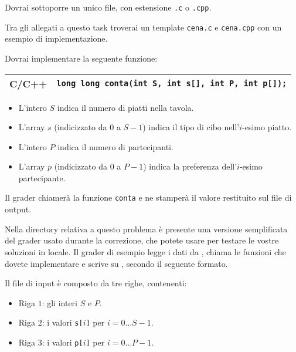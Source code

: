 
\Implementation

Dovrai sottoporre un unico file, con estensione \texttt{.c} o \texttt{.cpp}.

\begin{warning}
Tra gli allegati a questo task troverai un template \texttt{cena.c} e \texttt{cena.cpp}
con un esempio di implementazione.
\end{warning}

Dovrai implementare la seguente funzione:

\begin{center}\begin{tabularx}{\textwidth}{|c|X|}
\hline
C/C++  & \verb|long long conta(int S, int s[], int P, int p[]);|\\
\hline
\end{tabularx}\end{center}

\begin{itemize}[nolistsep]
  \item L'intero $S$ indica il numero di piatti nella tavola.
  \item L'array $s$ (indicizzato da $0$ a $S-1$) indica il tipo di cibo nell'$i$-esimo piatto.
  \item L'intero $P$ indica il numero di partecipanti.
  \item L'array $p$ (indicizzato da $0$ a $P-1$) indica la preferenza dell'$i$-esimo partecipante.
\end{itemize}

Il grader chiamerà la funzione \texttt{conta} e ne stamperà il valore restituito
sul file di output.



\Grader
Nella directory relativa a questo problema è presente una versione semplificata
del grader usato durante la correzione, che potete usare per testare le vostre
soluzioni in locale. Il grader di esempio legge i dati da , chiama
le funzioni che dovete implementare e scrive su \outputfile{}, secondo il
seguente formato.

Il file di input è composto da tre righe, contenenti:
\begin{itemize}[nolistsep,itemsep=2mm]
\item Riga $1$: gli interi $S$ e $P$.
\item Riga $2$: i valori \texttt{s[$i$]} per $i = 0\ldots S-1$.
\item Riga $3$: i valori \texttt{p[$i$]} per $i = 0\ldots P-1$.
\end{itemize}

